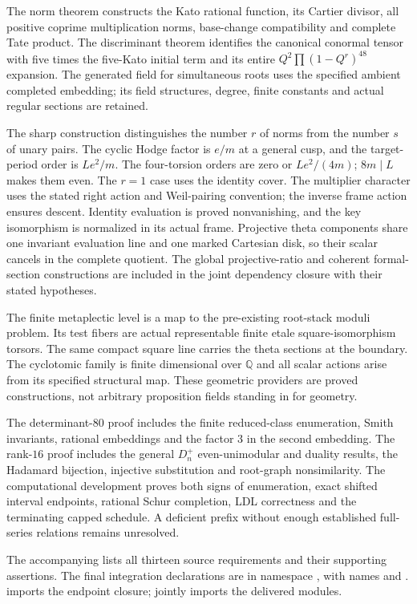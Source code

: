 \documentclass[11pt]{article}
\theoremstyle{remark}\newtheorem{remark}[theorem]{Remark}
\begin{document}
The norm theorem constructs the Kato rational function, its Cartier divisor,
all positive coprime multiplication norms, base-change compatibility and
complete Tate product. The discriminant theorem identifies the canonical
conormal tensor with five times the five-Kato initial term and its entire
$Q^2\prod(1-Q^r)^{48}$ expansion. The generated field for simultaneous roots
uses the specified ambient completed embedding; its field structures, degree,
finite constants and actual regular sections are retained.

The sharp construction distinguishes the number $r$ of norms from the number
$s$ of unary pairs. The cyclic Hodge factor is $e/m$ at a general cusp, and
the target-period order is $Le^2/m$. The four-torsion orders are zero or
$Le^2/(4m)$; $8m\mid L$ makes them even. The $r=1$ case uses the identity
cover. The multiplier character uses the stated right action and Weil-pairing
convention; the inverse frame action ensures descent. Identity evaluation
is proved nonvanishing, and the key isomorphism is normalized in its actual
frame. Projective theta components share one invariant evaluation line and
one marked Cartesian disk, so their scalar cancels in the complete quotient.
The global projective-ratio and coherent formal-section constructions are
included in the joint dependency closure with their stated hypotheses.

The finite metaplectic level is a map to the pre-existing root-stack moduli
problem. Its test fibers are actual representable finite etale square-isomorphism
torsors. The same compact square line carries the theta sections at the boundary.
The cyclotomic family is finite dimensional over $\mathbb Q$ and all scalar
actions arise from its specified structural map. These geometric providers are
proved constructions, not arbitrary proposition fields standing in for geometry.

The determinant-$80$ proof includes the finite reduced-class enumeration,
Smith invariants, rational embeddings and the factor $3$ in the second
embedding. The rank-$16$ proof includes the general $D_n^+$ even-unimodular
and duality results, the Hadamard bijection, injective substitution and
root-graph nonsimilarity. The computational development proves both signs
of enumeration, exact shifted interval endpoints, rational Schur completion,
LDL correctness and the terminating capped schedule. A deficient prefix
without enough established full-series relations remains unresolved.

\begingroup\raggedright
The accompanying  lists all thirteen source
requirements and their supporting assertions. The final integration
declarations are in namespace
, with names
 and .
 imports the endpoint closure;
 jointly imports the delivered modules.
\par\endgroup
\end{document}
